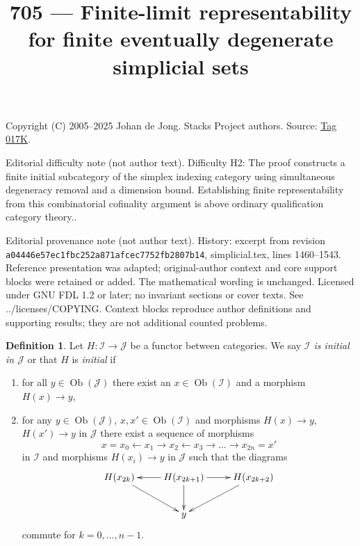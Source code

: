 \documentclass{amsart}
\theoremstyle{plain}
\theoremstyle{definition}
\newtheorem{definition}[subsection]{Definition}
\theoremstyle{remark}
\numberwithin{equation}{subsection}
\def\Ob{\mathop{\mathrm{Ob}}\nolimits}
\begin{document}
\title[Stacks Project, Tag 017K]{705 --- Finite-limit representability for finite eventually degenerate simplicial sets}
\maketitle
\noindent Copyright (C) 2005--2025 Johan de Jong. Stacks Project authors. Source: \href{https://stacks.math.columbia.edu/tag/017K}{Tag 017K}.

\noindent Editorial difficulty note (not author text). Difficulty H2: The proof constructs a finite initial subcategory of the simplex indexing category using simultaneous degeneracy removal and a dimension bound. Establishing finite representability from this combinatorial cofinality argument is above ordinary qualification category theory..

\noindent Editorial provenance note (not author text). History: excerpt from revision \texttt{a0444\allowbreak 6e57e\allowbreak c1fbc\allowbreak 252a8\allowbreak 71afc\allowbreak ec775\allowbreak 2fb28\allowbreak 07b14}, simplicial.tex, lines 1460--1543. Reference presentation was adapted; original-author context and core support blocks were retained or added. The mathematical wording is unchanged. Licensed under GNU FDL 1.2 or later; no invariant sections or cover texts. See ../licenses/COPYING. Context blocks reproduce author definitions and supporting results; they are not additional counted problems.

\begin{definition}
\label{categories-definition-initial}
Let $H : \mathcal{I} \to \mathcal{J}$ be a functor between categories.
We say {\it $\mathcal{I}$ is initial in $\mathcal{J}$} or that
$H$ is {\it initial} if
\begin{enumerate}
\item for all $y \in \Ob(\mathcal{J})$ there exist an
$x \in \Ob(\mathcal{I})$ and a morphism $H(x) \to y$,
\item for any $y \in \Ob(\mathcal{J})$, $x , x' \in \Ob(\mathcal{I})$ and
morphisms $H(x) \to y$, $H(x') \to y$ in $\mathcal{J}$
there exist a sequence of morphisms
$$
x = x_0 \leftarrow x_1 \rightarrow x_2 \leftarrow x_3 \rightarrow \ldots
\rightarrow x_{2n} = x'
$$
in $\mathcal{I}$ and morphisms $H(x_i) \to y$ in $\mathcal{J}$
such that the diagrams
$$
\xymatrix{
H(x_{2k}) \ar[rd] &
H(x_{2k + 1}) \ar[l] \ar[r] \ar[d] &
H(x_{2k + 2}) \ar[ld] \\
& y
}
$$
commute for $k = 0, \ldots, n - 1$.
\end{enumerate}
\end{definition}
\end{document}
